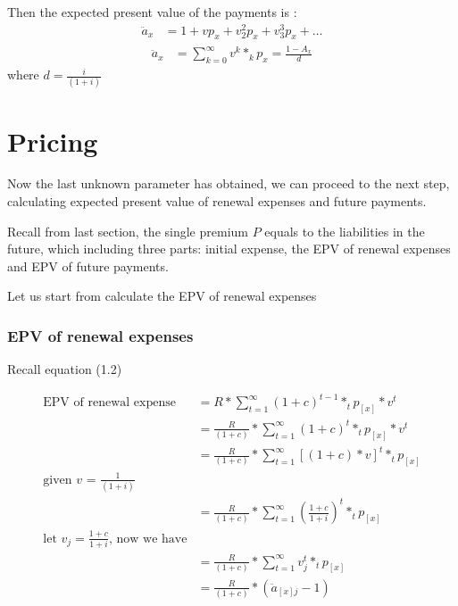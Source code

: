 \documentclass{report}
\begin{document}
Then the expected present value of the payments is :
\begin{align}
        \ddot{a}_x&= 1 + vp_x +v^2_2p_x +v^3_3p_x+ \dots\nonumber 
\end{align}
\begin{align}
        \ddot{a}_x&= \sum_{k=0}^{\infty} v^k*_kp_x = \frac{1-A_x}{d} \nonumber 
\end{align}
where $d=\frac{i}{(1+i)}$



\section{Pricing}


Now the last unknown parameter has obtained, we can proceed to the next step, calculating expected present value of renewal expenses and future payments.



Recall from last section, the single premium $P$ equals to the liabilities in the future, which including three parts: initial expense, the EPV of renewal expenses and EPV of future payments.


Let us start from calculate the EPV of renewal expenses
\subsubsection{EPV of renewal expenses}

Recall equation (1.2)

\begin{align}
        \text{EPV of renewal expense}&= R  * \sum_{t=1}^{\infty}(1 + c )^{t-1} * _tp_{[x]}* v^t \nonumber \\
        &= \frac{R}{(1+c)} * \sum_{t=1}^{\infty} (1 + c )^t * _tp_{[x]} * v^t \nonumber \\
        &= \frac{R}{(1+c)} * \sum_{t=1}^{\infty} [(1 + c )*v]^t * _tp_{[x]} \nonumber \\
\text{given $v$ = $\frac{1}{(1+i)} $}\nonumber \\
        &= \frac{R}{(1+c)} * \sum_{t=1}^{\infty} \left(\frac{1+c}{1+i}\right)^t * _tp_{[x]} \nonumber \\
\text{let $v_j = \frac{1+c}{1+i}$, now we have}\nonumber \\
        &= \frac{R}{(1+c)} * \sum_{t=1}^{\infty} v_j^t * _tp_{[x]} \\
        &= \frac{R}{(1+c)} * (\ddot{a}_{[x]j}-1)
\end{align}
\end{document}
